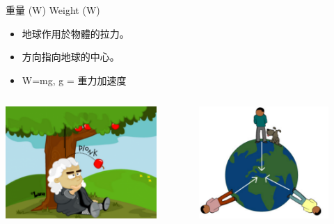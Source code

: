 \documentclass[beamer=true]{standalone}
\begin{document}
\begin{frame}{重量 (W) Weight (W)}
    \begin{itemize}
        \item 地球作用於物體的拉力。
        \item 方向指向地球的中心。
        \item W=mg, g = 重力加速度
    \end{itemize}
    \begin{columns}
        \centering
        \includegraphics[width=\textwidth]{assets/47712628.png}
        \begin{figure}[h!]
            \centering
            \includegraphics[width=\textwidth]{assets/97f12fb9.png}
        \end{figure}
    \end{columns}


\end{frame}
\end{document}
